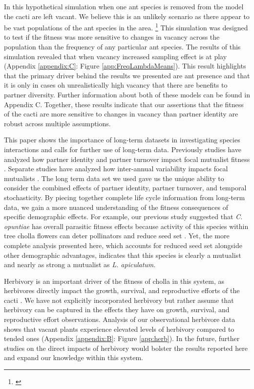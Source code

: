 \documentclass[11pt]{article}
\newcommand{\ali}[2]{{\color{blue}{#1}}\footnote{\textit{\color{blue}{#2}}}}
\begin{document}
In this hypothetical simulation when one ant species is removed from the model the cacti are left vacant.
We believe this is an unlikely scenario as there appear to be vast populations of the ant species in the area. \ali{}{This is just personal observation so it might be best to remove this?}
This simulation was designed to test if the fitness was more sensitive to changes in vacancy across the population than the frequency of any particular ant species.
The results of this simulation revealed that when vacancy increased sampling effect is at play (Appendix \ref{appendix:C}: Figure \ref{app:FreqLambdaMeans}).
This result highlights that the primary driver behind the results we presented are ant presence and that it is only in cases oh unrealistically high vacancy that there are benefits to partner diversity.
Further information about both of these models can be found in Appendix C.
Together, these results indicate that our assertions that the fitness of the cacti are more sensitive to changes in vacancy than partner identity are robust across multiple assumptions.


This paper shows the importance of long-term datasets in investigating species interactions and calls for further use of long-term data. 
Previously studies have analyzed how partner identity and partner turnover impact focal mutualist fitness \cite{Fonseca2003, Dejean2008, Noe1994, Barrett2015, Bruna2014, Trojelsgaard2015}.
Separate studies have analyzed how inter-annual variability impacts focal mutualists \cite{Alonso1998, Alarcon2008, Ollerton2006, Horvitz1990, Lazaro2022}.
The long term data set we used gave us the unique ability to consider the combined effects of partner identity, partner turnover, and temporal stochasticity.
By piecing together complete life cycle information from long-term data, we gain a more nuanced understanding of the fitness consequences of specific demographic effects. 
For example, our previous study suggested that \textit{C. opuntiae} has overall parasitic fitness effects because activity of this species within tree cholla flowers can deter pollinators and reduce seed set \citep{Ohm2014}. 
Yet, the more complete analysis presented here, which accounts for reduced seed set alongside other demographic advantages, indicates that this species is clearly a mutualist and nearly as strong a mutualist as \textit{L. apiculatum}. 

Herbivory is an important driver of the fitness of cholla in this system, as herbivores directly impact the growth, survival, and reproductive efforts of the cacti \citep{Miller2009}.
We have not explicitly incorporated herbivory but rather assume that herbivory can be captured in the effects they have on growth, survival, and reproductive effort observations.
Analysis of our observational herbivore data shows that vacant plants experience elevated levels of herbivory compared to tended ones (Appendix \ref{appendix:B}: Figure \ref{app:herb}).
In the future, further studies on the direct impacts of herbivory would bolster the results reported here and expand our knowledge within this system.
\end{document}
